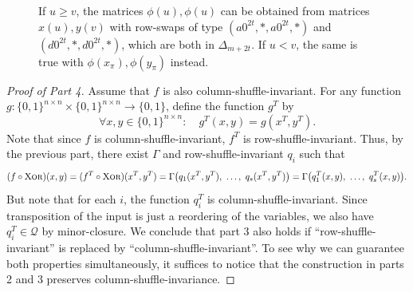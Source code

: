 \documentclass{article}
\begin{document}
\begin{figure}[ht]
        \centering
        
        \caption{If $u \geq v$, the matrices $\phi(u),\phi(u)$ can be obtained from matrices $x(u),y(v)$ with row-swaps of type $(a0^{2t},\ast,a0^{2t},\ast)$ and $(d0^{2t},\ast,d0^{2t},\ast)$, which are both in $\Delta_{m + 2t}$. If $u < v$, the same is true with $\phi(x_\pi),\phi(y_\pi)$ instead.}
        \label{fig:stable}
    \end{figure}

\begin{proof}[Proof of Part 4]
    Assume that $f$ is also column-shuffle-invariant. For any function $g\colon \{0,1\}^{n\times n}\times \{0,1\}^{n\times n}\to\{0,1\}$, define the function $g^T$ by
    \[
        \forall x,y\in\{0,1\}^{n\times n}:\quad
        g^T(x,y) = g(x^T,y^T).
    \]
    Note that since $f$ is column-shuffle-invariant, $f^T$ is row-shuffle-invariant. Thus, by the previous part, there exist $\Gamma$ and row-shuffle-invariant $q_i$ such that
    \[
        (f\circ \operatorname{\textsc{Xor}})(x,y) = (f^T\circ \operatorname{\textsc{Xor}})(x^T,y^T) = \Gamma\big(q_1(x^T,y^T),\ \dots,\ q_s(x^T,y^T)\big) = \Gamma\big(q_1^T(x,y),\ \dots,\ q_s^T(x,y)\big).
    \]
    But note that for each $i$, the function $q_i^T$ is column-shuffle-invariant. Since transposition of the input is just a reordering of the variables, we also have $q_i^T \in \mathcal{Q}$ by minor-closure. We conclude that part 3 also holds if ``row-shuffle-invariant'' is replaced by ``column-shuffle-invariant''. To see why we can guarantee both properties simultaneously, it suffices to notice that the construction in parts 2 and 3 preserves column-shuffle-invariance.
\end{proof}
\end{document}
